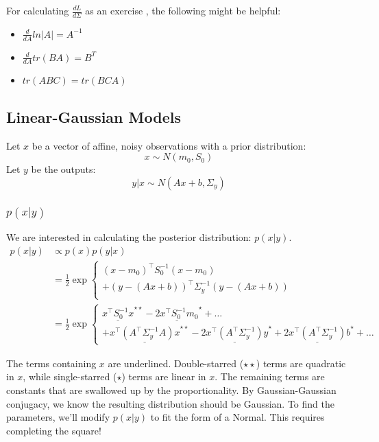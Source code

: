 \documentclass{article}
\begin{document}
\noindent For calculating $\frac{dL}{d\Sigma}$ as an exercise , the following might be helpful: \\
\begin{itemize}
\item $\frac{d}{dA} ln |A| = A^{-1}$ \\
\item $\frac{d}{dA} tr(BA) = B^T$ \\
\item $tr(ABC) = tr(BCA)$
\end{itemize}



 
\subsection{Linear-Gaussian Models}

Let $x$ be a vector of affine, noisy observations with a prior distribution: $$x \sim N(m_0, S_0)$$ Let $y$ be the outputs: $$y|x \sim N(Ax + b, \Sigma_y)$$

\subsubsection{$p(x|y)$}
We are interested in calculating the posterior distribution: $p(x|y)$.
\begin{align*}
  p(x|y) & \propto p(x) p(y|x) \\
         & =
           \frac{1}{2} \exp \begin{cases}
             (x - m_0)^\top S_0^{-1} (x - m_0) \\
             + (y - (Ax + b))^\top \Sigma_y^{-1} (y - (Ax + b)) \\
           \end{cases} \\
         & = \frac{1}{2} \exp
           \begin{cases} 
             \underline{x^\top S_0^{-1} x}^{\star \star} - \underline{2x^\top S_0^{-1} m_0}^{\star} + \ldots \\
             + \underline{x^\top (A^\top \Sigma_y^{-1}A)x}^{\star \star} - \underline{2x^\top(A^\top\Sigma_y^{-1})y}^{\star} + \underline{2x^\top(A^\top\Sigma_y^{-1})b}^{\star} + \ldots
           \end{cases}
\end{align*}

The terms containing $x$ are underlined. Double-starred ($\star \star$) terms are quadratic in $x$, while single-starred ($\star$) terms are linear in $x$. The remaining terms are constants that are swallowed up by the proportionality. By Gaussian-Gaussian conjugacy, we know the resulting distribution should be Gaussian. To find the parameters, we'll modify $p(x|y)$ to fit the form of a Normal. This requires completing the square!
\end{document}
